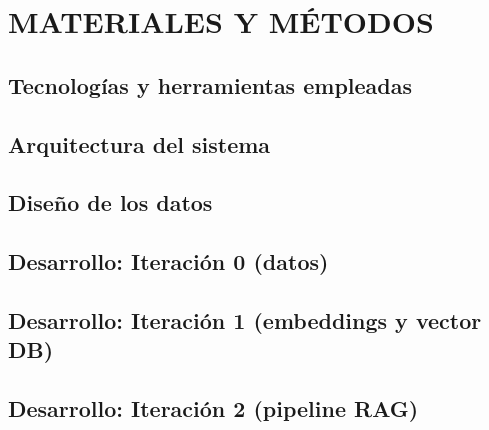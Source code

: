 \chapter{MATERIALES Y MÉTODOS}


\section{Tecnologías y herramientas empleadas}


\section{Arquitectura del sistema}


\section{Diseño de los datos}


\section{Desarrollo: Iteración 0 (datos)}

\section{Desarrollo: Iteración 1 (embeddings y vector DB)}

\section{Desarrollo: Iteración 2 (pipeline RAG)}

